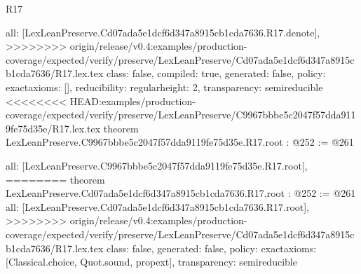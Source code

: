 \begin{lexlean}{R17}
\begin{coremodule}
{{{{{  all: [LexLeanPreserve.Cd07ada5e1dcf6d347a8915cb1cda7636.R17.denote],
>>>>>>>> origin/release/v0.4:examples/production-coverage/expected/verify/preserve/LexLeanPreserve/Cd07ada5e1dcf6d347a8915cb1cda7636/R17.lex.tex
  class: false,
  compiled: true,
  generated: false,
  policy: exact{axioms: []},
  reducibility: regular{height: 2},
  transparency: semireducible
}
<<<<<<<< HEAD:examples/production-coverage/expected/verify/preserve/LexLeanPreserve/C9967bbbe5c2047f57dda9119fe75d35e/R17.lex.tex
theorem LexLeanPreserve.C9967bbbe5c2047f57dda9119fe75d35e.R17.root : @252 := @261 {
  all: [LexLeanPreserve.C9967bbbe5c2047f57dda9119fe75d35e.R17.root],
========
theorem LexLeanPreserve.Cd07ada5e1dcf6d347a8915cb1cda7636.R17.root : @252 := @261 {
  all: [LexLeanPreserve.Cd07ada5e1dcf6d347a8915cb1cda7636.R17.root],
>>>>>>>> origin/release/v0.4:examples/production-coverage/expected/verify/preserve/LexLeanPreserve/Cd07ada5e1dcf6d347a8915cb1cda7636/R17.lex.tex
  class: false,
  generated: false,
  policy: exact{axioms: [Classical.choice, Quot.sound, propext]},
  transparency: semireducible
}

}}}}}
\end{coremodule}
\end{lexlean}
